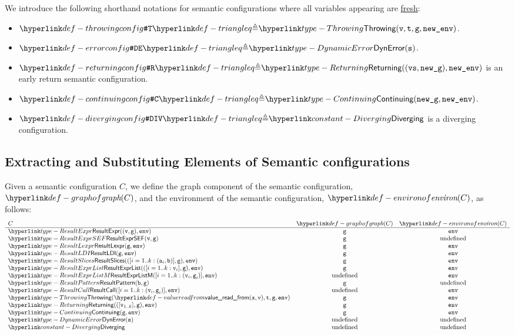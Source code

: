 We introduce the following shorthand notations for semantic configurations where all variables
appearing are \hyperlink{def-freshvariables}{fresh}:
\begin{itemize}
\hypertarget{def-throwingconfig}{}
\item $\ThrowingConfig \triangleq \Throwing(\vv, \vt, \vg, \newenv)$.
      \hypertarget{def-errorconfig}{}
\item $\DynErrorConfig \triangleq \DynamicError(\vs)$.
      \hypertarget{def-returningconfig}{}
\item $\ReturningConfig \triangleq \Returning((\vvs,\newg), \newenv)$
      is an early return semantic configuration.
\hypertarget{def-continuingconfig}{}
\item $\ContinuingConfig \triangleq \Continuing(\newg, \newenv)$.
      \hypertarget{def-divergingconfig}{}
\item $\DivergingConfig \triangleq \Diverging$ is a diverging configuration.
\end{itemize}

\subsection{Extracting and Substituting Elements of Semantic configurations}

\hypertarget{def-graphof}{}
\hypertarget{def-environof}{}
Given a semantic configuration $C$, we define the graph component of the semantic configuration, \\
$\graphof{C}$, and the environment of the semantic configuration, $\environof{C}$, as follows:
\[
\begin{array}{lcc}
  C & \graphof{C} & \environof{C}\\
  \hline
  \ResultExpr((\vv, \vg), \env) & \vg & \env\\
  \ResultExprSEF(\vv, \vg) & \vg & \text{undefined}\\
  \ResultLexpr(\vg, \env) & \vg & \env \\
  \ResultLDI(\vg, \env) & \vg & \env \\
  \ResultSlices(([i=1..k: (\va_i,\vb)], \vg), \env) & \vg & \env \\
  \ResultExprList(([i=1..k: \vv_i], \vg), \env) & \vg & \env \\
  \ResultExprListM([i=1..k: (\vv_i,\vg_i)], \env) & \text{undefined} & \env\\
  \ResultPattern(\vb, \vg) & \vg & \text{undefined}\\
  \ResultCall([i=1..k: (\vv_i,\vg_i)], \env) & \text{undefined} & \env\\
  \Throwing(\valuereadfrom(\vx,\vv),\vt,\vg, \env) & \vg & \env\\
  \Returning(([\vv_{1..k}],\vg), \env) & \vg & \env\\
  \Continuing(\vg, \env) & \vg & \env\\
  \DynamicError(\vs) & \text{undefined} & \text{undefined}\\
  \Diverging & \text{undefined} & \text{undefined}\\
\end{array}
\]

